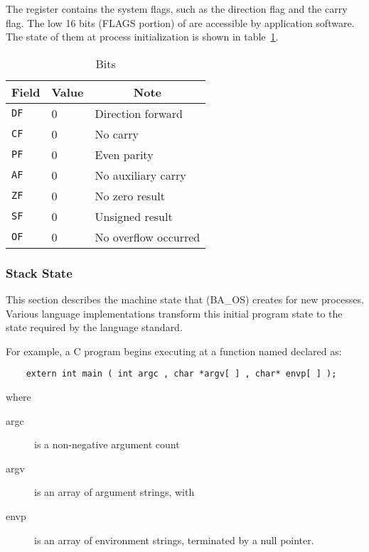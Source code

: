 The  register contains the system flags, such as the
direction flag and the carry flag.  The low 16 bits (FLAGS portion)
of  are accessible by
application software.  The state of them at process initialization
is shown in table~\ref{rflags-status}.

\begin{table}[H]
\Hrule
  \caption{ Bits}
  \label{rflags-status}
  \begin{center}
    \begin{tabular}[t]{l|l|l}
      \multicolumn{1}{c}{Field} & \multicolumn{1}{c}{Value}& \multicolumn{1}{c}{Note} \\
      \hline
      \texttt{DF} & 0 & Direction forward\\
      \texttt{CF} & 0 & No carry\\
      \texttt{PF} & 0 & Even parity\\
      \texttt{AF} & 0 & No auxiliary carry\\
      \texttt{ZF} & 0 & No zero result\\
      \texttt{SF} & 0 & Unsigned result\\
      \texttt{OF} & 0 & No overflow occurred\\
    \end{tabular}
  \end{center}
\Hrule
\end{table}

\subsubsection{Stack State}

This section describes the machine state that (BA\_OS) creates
for new processes. Various language implementations transform this
initial program state to the state required by the language standard.

For example, a C program begins executing at a
function named  declared as:

\begin{footnotesize}
\begin{verbatim}
    extern int main ( int argc , char *argv[ ] , char* envp[ ] );
\end{verbatim}
\end{footnotesize}

where
\begin{description}
 \item[argc] is a non-negative argument count
 \item[argv] is an array of argument strings, with 
 \item[envp] is an array of environment strings,
             terminated by a null pointer.
\end{description}

